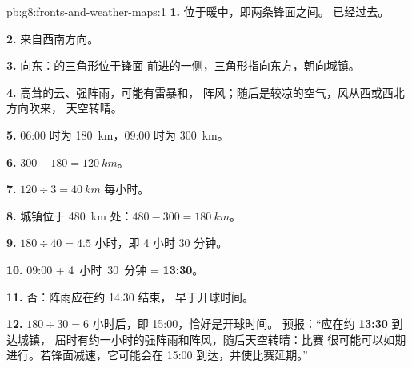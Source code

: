 \begin{solution}{pb:g8:fronts-and-weather-maps:1}
\textbf{1.} 位于暖中，即两条锋面之间。
已经过去。

\textbf{2.} 来自西南方向。

\textbf{3.} 向东：的三角形位于锋面
前进的一侧，三角形指向东方，朝向城镇。

\textbf{4.} 高耸的云、强阵雨，可能有雷暴和，
阵风；随后是较凉的空气，风从西或西北方向吹来，
天空转晴。

\textbf{5.} 06:00 时为 \qty{180}{km}，09:00 时为 \qty{300}{km}。

\textbf{6.} $300 - 180 = \qty{120}{km}$。

\textbf{7.} $120 \div 3 = \qty{40}{km}$ 每小时。

\textbf{8.} 城镇位于 \qty{480}{km} 处：$480 - 300 = \qty{180}{km}$。

\textbf{9.} $180 \div 40 = 4.5$ 小时，即 4 小时 30 分钟。

\textbf{10.} 09:00 + 4~小时~30~分钟 = \textbf{13:30}。

\textbf{11.} 否：阵雨应在约 14:30 结束，
早于开球时间。

\textbf{12.} $180 \div 30 = 6$ 小时后，即 15:00，恰好是开球时间。
预报：“应在约 \textbf{13:30} 到达城镇，
届时有约一小时的强阵雨和阵风，随后天空转晴：比赛
很可能可以如期进行。若锋面减速，它可能会在
15:00 到达，并使比赛延期。”
\end{solution}
